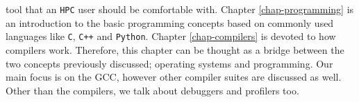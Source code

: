 tool that an \texttt{HPC} user should be comfortable with.
\newline \newline 
Chapter \ref{chap-programming} is an introduction to the basic programming concepts
based on commonly used languages like \texttt{C}, \texttt{C++} and \texttt{Python}. 
\newline \newline 
Chapter \ref{chap-compilers} is devoted to how compilers work. Therefore, this chapter can be thought
as a bridge between the two concepts previously discussed; operating systems and programming. Our main
focus is on the GCC, however other compiler suites are discussed as well. Other than the compilers, 
we talk about debuggers and profilers too.
